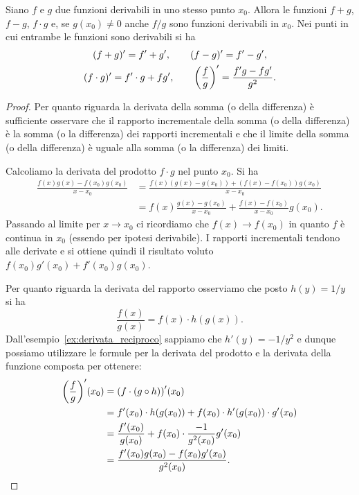 \begin{theorem}
  \label{th:derivate_operazioni}%
\mymark{***}%
Siano $f$ e $g$ due funzioni derivabili in uno stesso punto $x_0$.
Allora le funzioni $f+g$, $f-g$, $f\cdot g$ e, se $g(x_0)\neq 0$ anche $f/g$ sono funzioni derivabili in $x_0$. Nei punti in cui entrambe le funzioni sono derivabili si ha
\begin{gather*}
  (f+g)' = f' + g', \qquad
  (f-g)' = f' - g', \\
  (f\cdot g)' = f' \cdot g + f g', \qquad
  {\left( \frac{f}{g} \right)}' = \frac{f'g - fg'}{g^2}.
\end{gather*}
\end{theorem}
%
\begin{proof}
\mymark{***}
Per quanto riguarda la derivata della somma (o della differenza) è sufficiente osservare che il rapporto incrementale della somma (o della differenza) è la somma (o la differenza) dei rapporti incrementali e che il limite della somma (o della differenza) è uguale alla somma (o la differenza) dei limiti.

Calcoliamo la derivata del prodotto $f\cdot g$ nel punto $x_0$. Si ha
\begin{align*}
  \frac{f(x)g(x) - f(x_0)g(x_0)}{x-x_0}
  &= \frac{f(x)(g(x) - g(x_0)) + (f(x)-f(x_0))g(x_0)}{x-x_0}\\
  &= f(x) \frac{g(x)-g(x_0)}{x-x_0} + \frac{f(x)-f(x_0)}{x-x_0} g(x_0).
\end{align*}
Passando al limite per $x\to x_0$ ci ricordiamo che $f(x)\to f(x_0)$ in quanto $f$ è continua in $x_0$ (essendo per ipotesi derivabile). I rapporti incrementali tendono alle derivate e si ottiene quindi il risultato voluto $f(x_0) g'(x_0) + f'(x_0) g(x_0)$.

Per quanto riguarda la derivata del rapporto osserviamo che
posto $h(y)=1/y$ si ha
\[
  \frac{f(x)}{g(x)} = f(x) \cdot h(g(x)).
\]
Dall'esempio~\ref{ex:derivata_reciproco} sappiamo che $h'(y) = -1/y^2$ e dunque
possiamo utilizzare le formule per la derivata del prodotto e la derivata della funzione composta per ottenere:
\begin{align*}
  {\left( \frac{f}{g} \right)}'(x_0)
  &= {\left( f \cdot (g\circ h) \right)}'(x_0) \\
  &= f'(x_0) \cdot h(g(x_0)) + f(x_0) \cdot h'(g(x_0))\cdot g'(x_0)\\
  &= \frac{f'(x_0)}{g(x_0)} + f(x_0) \cdot \frac{-1}{g^2(x_0)} g'(x_0)\\
  &= \frac{f'(x_0)g(x_0) - f(x_0)g'(x_0)}{g^2(x_0)}.
\end{align*}
\end{proof}

